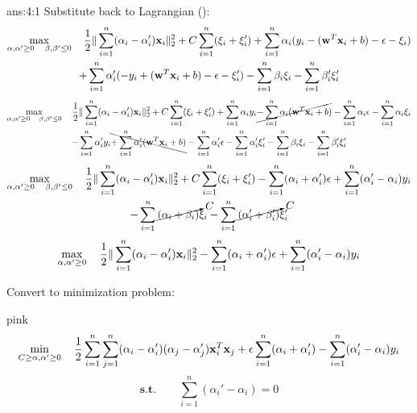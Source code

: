 \documentclass{tron}
\begin{document}
\begin{answer}{ans:4:1}
	Substitute back to Lagrangian ():
	\begin{multline}
		\max_{\alpha, \alpha' \geq 0  \quad \beta, \beta' \leq 0} \quad \frac12 \| \sum_{i=1}^n (\alpha_i  -  \alpha_i') \mathbf{x}_i \|_2^2 + C\sum_{i=1}^n (\xi_i + \xi_i') 
		 + \sum_{i=1}^n \alpha_i (y_i -(\mathbf{w}^T \mathbf{x}_i + b) - \epsilon - \xi_i)  \\
		+ \sum_{i=1}^n \alpha_i' (- y_i + (\mathbf{w}^T \mathbf{x}_i + b) - \epsilon - \xi_i' ) 
		- \sum_{i=1}^n \beta_i \xi_i - \sum_{i=1}^n \beta_i' \xi_i' 
	\end{multline}
	\begin{multline}
		\max_{\alpha, \alpha' \geq 0  \quad \beta, \beta' \leq 0} \quad \frac12 \| \sum_{i=1}^n (\alpha_i  -  \alpha_i') \mathbf{x}_i \|_2^2 + C\sum_{i=1}^n (\xi_i + \xi_i') 
		 + \sum_{i=1}^n \alpha_i y_i \cancel{- \sum_{i=1}^n \alpha_i (\mathbf{w}^T \mathbf{x}_i + b)} - \sum_{i=1}^n \alpha_i \epsilon -  \sum_{i=1}^n \alpha_i \xi_i  \\
		- \sum_{i=1}^n \alpha_i' y_i \bcancel{+ \sum_{i=1}^n \alpha_i' (\mathbf{w}^T \mathbf{x}_i + b)} - \sum_{i=1}^n \alpha_i' \epsilon -  \sum_{i=1}^n \alpha_i'\xi_i' 
		- \sum_{i=1}^n \beta_i \xi_i - \sum_{i=1}^n \beta_i' \xi_i' 
	\end{multline}
	\begin{multline}
		\max_{\alpha, \alpha' \geq 0  \quad \beta, \beta' \leq 0} \quad \frac12 \| \sum_{i=1}^n (\alpha_i  -  \alpha_i') \mathbf{x}_i \|_2^2 + C\sum_{i=1}^n (\xi_i + \xi_i')
		  - \sum_{i=1}^n (\alpha_i+\alpha_i') \epsilon + \sum_{i=1}^n (\alpha_i'-\alpha_i)y_i\\ - 
		  \sum_{i=1}^n \cancelto{C}{(\alpha_i + \beta_i)} \xi_i
		-  \sum_{i=1}^n \cancelto{C}{(\alpha_i' + \beta_i')} \xi_i'
	\end{multline}
	\begin{equation}
		\max_{\alpha, \alpha' \geq 0} \quad \frac12 \| \sum_{i=1}^n (\alpha_i  -  \alpha_i') \mathbf{x}_i \|_2^2 - \sum_{i=1}^n (\alpha_i+\alpha_i') \epsilon + \sum_{i=1}^n (\alpha_i'-\alpha_i)y_i
	\end{equation}
	
	Convert to minimization problem:
	\begin{note}{pink}{}
		\begin{equation}
			\min_{C \geq \alpha, \alpha' \geq 0} \quad \frac12 \sum_{i=1}^n \sum_{j=1}^n (\alpha_i  -  \alpha_i')(\alpha_j  -  \alpha_j') \mathbf{x}_i^T \mathbf{x}_j  + \epsilon \sum_{i=1}^n (\alpha_i+\alpha_i') - \sum_{i=1}^n (\alpha_i'-\alpha_i)y_i
		\end{equation}
		\begin{equation}
			\textbf{s.t.} \qquad \sum_{i=1}^n (\alpha_i' - \alpha_i) = 0
		\end{equation}
	\end{note}

\end{answer}
\end{document}
